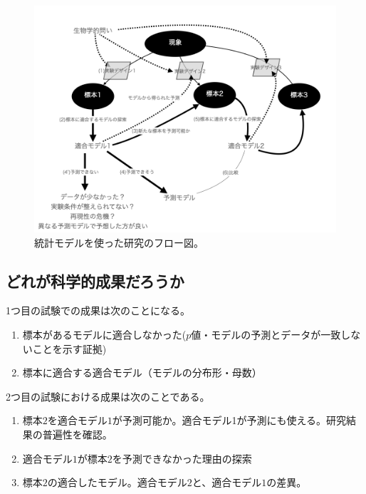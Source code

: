 \begin{figure}
    \begin{center}
        \includegraphics[width=15cm]{./image/01_/conceptual_diagram/conceptual_diagram.006.png}
        \caption{統計モデルを使った研究のフロー図。}
        \label{fig:conceptual_diagram_statistics_research}
    \end{center}
\end{figure}

\subsection{どれが科学的成果だろうか}
1つ目の試験での成果は次のことになる。
\begin{enumerate}
    \item 標本があるモデルに適合しなかった($p$値・モデルの予測とデータが一致しないことを示す証拠)
    \item 標本に適合する適合モデル（モデルの分布形・母数）
\end{enumerate}

2つ目の試験における成果は次のことである。
\begin{enumerate}
    \item 標本$2$を適合モデル$1$が予測可能か。適合モデル1が予測にも使える。研究結果の普遍性を確認。
    \item 適合モデル$1$が標本$2$を予測できなかった理由の探索
    \item 標本$2$の適合したモデル。適合モデル$2$と、適合モデル$1$の差異。
\end{enumerate}



